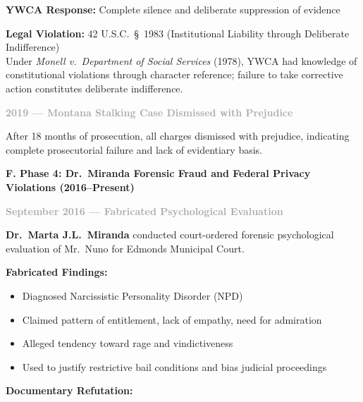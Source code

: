 \documentclass[11pt, letterpaper]{article}
\newcommand{\subsectiontitle}[1]{\vspace{0.15in}\noindent\textcolor{NavyBlue}{\textbf{#1}}\vspace{0.05in}}
\newcommand{\subsubsectiontitle}[1]{\vspace{0.1in}\noindent\textcolor{DarkGray}{\textbf{#1}}\vspace{0.05in}}
\begin{document}
\textbf{YWCA Response:} Complete silence and deliberate suppression of evidence

\textbf{Legal Violation:} 42 U.S.C.\ \S\ 1983 (Institutional Liability through Deliberate Indifference)\\
Under \textit{Monell v.\ Department of Social Services} (1978), YWCA had knowledge of constitutional violations through character reference; failure to take corrective action constitutes deliberate indifference.

\subsubsectiontitle{2019 --- Montana Stalking Case Dismissed with Prejudice}

After 18 months of prosecution, all charges dismissed with prejudice, indicating complete prosecutorial failure and lack of evidentiary basis.

\subsectiontitle{F. Phase 4: Dr.\ Miranda Forensic Fraud and Federal Privacy Violations (2016--Present)}

\subsubsectiontitle{September 2016 --- Fabricated Psychological Evaluation}

\textbf{Dr.\ Marta J.L.\ Miranda} conducted court-ordered forensic psychological evaluation of Mr.\ Nuno for Edmonds Municipal Court.

\textbf{Fabricated Findings:}
\begin{itemize}[leftmargin=*,itemsep=2pt]
    \item Diagnosed Narcissistic Personality Disorder (NPD)
    \item Claimed pattern of entitlement, lack of empathy, need for admiration
    \item Alleged tendency toward rage and vindictiveness
    \item Used to justify restrictive bail conditions and bias judicial proceedings
\end{itemize}

\textbf{Documentary Refutation:}
\end{document}
